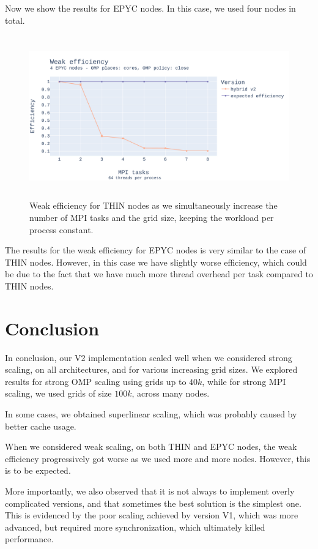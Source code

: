 \documentclass{report}
\begin{document}
Now we show the results for EPYC nodes. In this case, we used four nodes in total.

\begin{figure}[H]
\centering
\includegraphics[width=14cm, height=7cm]{./images/weak_MPI_epyc_hybrid.pdf}
\caption{\label{fig:weakmpiepychybrid} Weak efficiency for THIN nodes as 
we simultaneously increase the number of MPI tasks and the grid size, keeping the 
workload per process constant.}
\end{figure}

The results for the weak efficiency for EPYC nodes is very similar to the case 
of THIN nodes. However, in this case we have slightly worse efficiency, which 
could be due to the fact that we have much more thread overhead per task compared 
to THIN nodes.

\section{Conclusion}

In conclusion, our V2 implementation scaled well when we considered strong scaling, 
on all architectures, and for various increasing grid sizes. We explored results for 
strong OMP scaling using grids up to $40k$, while for strong MPI scaling, we used 
grids of size $100k$, across many nodes.  

In some cases, we obtained superlinear scaling, which was probably caused by better 
cache usage. 

When we considered weak scaling, on both THIN and EPYC nodes, the weak 
efficiency progressively got worse as we used more and more nodes. However, 
this is to be expected.

More importantly, we also observed that it is not always to implement overly 
complicated versions, and that sometimes the best solution is the simplest one. 
This is evidenced by the poor scaling achieved by version V1, which was more 
advanced, but required more synchronization, which ultimately killed performance.
\end{document}
